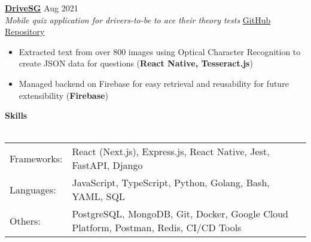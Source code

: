 \documentclass[a4paper]{article}
\newcommand{\lineunder} {
    \vspace*{-8pt} \\
    \hspace*{-12pt} \hrulefill \\
}
\newcommand{\header} [1] {
    {\hspace*{-12pt}\vspace*{6pt} \large\textbf{#1}}
    \vspace*{-6pt} \lineunder
}
\begin{document}
\textbf{\href{https://play.google.com/store/apps/details?id=com.jianrong7.drivesg}{DriveSG}} \hfill Aug 2021\\
\textit{Mobile quiz application for drivers-to-be to ace their theory tests} \hfill \href{https://github.com/jianrong7/drivesg}{GitHub Repository}\\
\vspace{-2mm}
\begin{itemize} \itemsep 1pt
    \item Extracted text from over 800 images using Optical Character Recognition to create JSON data for questions (\textbf{React Native, Tesseract.js})
    \item Managed backend on Firebase for easy retrieval and reusability for future extensibility (\textbf{Firebase})
\end{itemize}

\header{Skills}
\vspace{1mm}
\begin{tabular}{ l l }
	Frameworks: & React (Next.js), Express.js, React Native, Jest, FastAPI, Django              \\
	Languages:  & JavaScript, TypeScript, Python, Golang, Bash, YAML, SQL                                \\
	Others:     & PostgreSQL, MongoDB, Git, Docker, Google Cloud Platform, Postman, Redis, CI/CD Tools   \\
\end{tabular}
\end{document}
